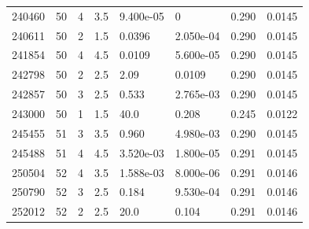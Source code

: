 \documentclass[preview]{standalone}
\begin{document}
{{{{{\begin{tabular}{L{1.2cm}C{1.2cm} C{0.3cm}C{0.5cm} C{1.4cm}C{1.4cm} C{1.4cm}C{1.4cm}}
  240460  &    50  & 4     & 3.5 &  9.400e-05  & 0  & 0.290 &  0.0145   \\ 
  240611  &    50  & 2     & 1.5 &  0.0396  & 2.050e-04  & 0.290 &  0.0145   \\ 
  241854  &    50  & 4     & 4.5 &  0.0109  & 5.600e-05  & 0.290 &  0.0145   \\ 
  242798  &    50  & 2     & 2.5 &  2.09  & 0.0109  & 0.290 &  0.0145   \\ 
  242857  &    50  & 3     & 2.5 &  0.533  & 2.765e-03  & 0.290 &  0.0145   \\ 
  243000  &    50  & 1     & 1.5 &  40.0  & 0.208  & 0.245 &  0.0122   \\ 
  245455  &    51  & 3     & 3.5 &  0.960  & 4.980e-03  & 0.290 &  0.0145   \\ 
  245488  &    51  & 4     & 4.5 &  3.520e-03  & 1.800e-05  & 0.291 &  0.0145   \\ 
  250504  &    52  & 4     & 3.5 &  1.588e-03  & 8.000e-06  & 0.291 &  0.0146   \\ 
  250790  &    52  & 3     & 2.5 &  0.184  & 9.530e-04  & 0.291 &  0.0146   \\ 
  252012  &    52  & 2     & 2.5 &  20.0  & 0.104  & 0.291 &  0.0146   \\ 
\hline 
\end{tabular} 

}}}}}
\end{document}
